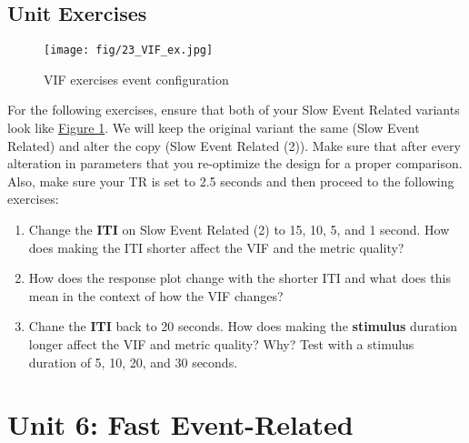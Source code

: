 \documentclass[10pt]{article}
\begin{document}
	\subsection{Unit Exercises}
	\label{subsec:u5exercises}
		\begin{figure}[ht]
			\centering
			\texttt{[image: fig/23\_VIF\_ex.jpg]}
			\caption{VIF exercises event configuration}
			\label{fig:VIF_ex}
		\end{figure}
		For the following exercises, ensure that both of your Slow Event Related variants look like \hyperref[fig:VIF_ex]{Figure \ref{fig:VIF_ex}}.
		We will keep the original variant the same (Slow Event Related) and alter the copy (Slow Event Related (2)).
		Make sure that after every alteration in parameters that you re-optimize the design for a proper comparison. \\
		Also, make sure your TR is set to 2.5 seconds and then proceed to the following exercises:
		\begin{enumerate}
			\item Change the \textbf{ITI} on Slow Event Related (2) to 15, 10, 5, and 1 second. How does making the ITI shorter affect the VIF and the metric quality?
			\item How does the response plot change with the shorter ITI and what does this mean in the context of how the VIF changes?
			\item Chane the \textbf{ITI} back to 20 seconds. How does making the \textbf{stimulus} duration longer affect the VIF and metric quality? Why? Test with a stimulus duration of 5, 10, 20, and 30 seconds.
		\end{enumerate}
\newpage


\section{Unit 6: Fast Event-Related}
\label{sec:unit6}
\end{document}
